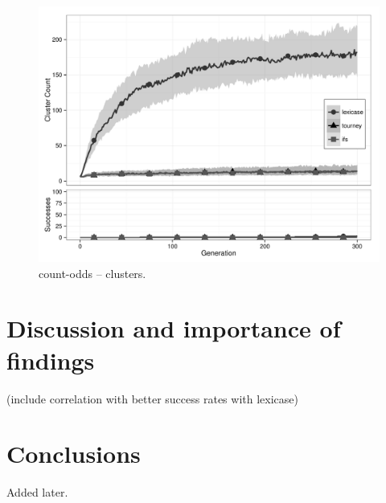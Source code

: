 \begin{figure}%
\centering
\includegraphics[width=11.5cm]{count-odds-cluster.pdf}
\caption{count-odds -- clusters.}
\label{count-oddsClu}
\end{figure}


\section{Discussion and importance of findings}

(include correlation with better success rates with lexicase)

\section{Conclusions}


\begin{acknowledgement}
Added later.
\end{acknowledgement}



